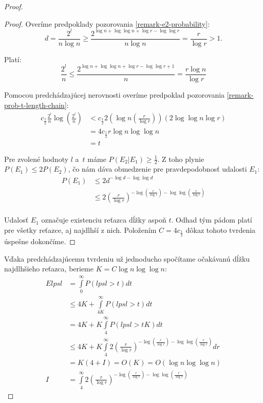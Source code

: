 \begin{proof}
\begin{proof}
Overíme predpoklady pozorovania \ref{remark-e2-probability}:
\begin{displaymath}
d = \frac{2^l}{n \log n} \geq \frac{2^{\log n + \log \log n + \log r - \log \log r}}{n \log n} = \frac{r}{\log r} > 1\textit{.}
\end{displaymath}

Platí:
\begin{displaymath}
\frac{2^l}{n} \leq \frac{2 ^{\log n + \log \log n + \log r - \log \log r + 1}}{n} = \frac{r\log n}{\log r}
\end{displaymath}

Pomocou predchádzajúcej nerovnosti overíme predpoklad pozorovania \ref{remark-prob-t-length-chain}:
\begin{displaymath}
\begin{split}
c_{\frac{1}{2}}\frac{2^l}{n}\log\left(\frac{2^l}{n}\right)
	& < c_{\frac{1}{2}} 2 \left(\log n \left(\frac{r}{\log r}\right)\right)\left(2\log\log n \log r\right) \\
	& = 4 c_{\frac{1}{2}} r \log n \log \log n \\
	& = t
\end{split}
\end{displaymath}

Pre zvolené hodnoty $l$ a~$t$ máme $P(E_2 | E_1) \geq \frac{1}{2}$. Z toho plynie $P(E_1) \leq 2 P(E_2)$, čo nám dáva obmedzenie pre pravdepodobnosť udalosti $E_1$:
\begin{displaymath}
\begin{split}
P(E_1) 
	& \leq 2d^{-\log d - \log \log d} \\
	& \leq 2\left(\frac{r}{\log r}\right)^{-\log \left(\frac{r}{\log r}\right) - \log \log \left(\frac{r}{\log r}\right)} \\
\end{split}
\end{displaymath}

Udalosť $E_1$ označuje existenciu reťazca dĺžky aspoň $t$. Odhad tým pádom platí pre všetky reťazce, aj najdlhší z nich. Položením $C = 4c_{\frac{1}{2}}$ dôkaz tohoto tvrdenia úspešne dokončíme.
\end{proof}

Vďaka predchádzajúcemu tvrdeniu už jednoducho spočítame očakávanú dĺžku najdlhšieho reťazca, berieme $K = C\log n \log \log n$:
\begin{displaymath}
\begin{split}
E lpsl 
	& = \int\limits_0^{\infty} P(lpsl > t) dt \\
	& \leq 4K + \int\limits_{4K}^\infty P(lpsl > t) dt \\
	& = 4K + K \int\limits_4^\infty P(lpsl > tK) dt \\
	& \leq 4K + K \int\limits_4^\infty 2 \left(\frac{r}{\log r}\right)^{-\log \left(\frac{r}{\log r}\right) - \log \log \left(\frac{r}{\log r}\right)} dr \\
	& = K(4 + I) = O(K) = O(\log n \log \log n) \\
I 	& = \int\limits_4^\infty 2 \left(\frac{r}{\log r}\right)^{-\log \left(\frac{r}{\log r}\right) - \log \log \left(\frac{r}{\log r}\right)}
\end{split}
\end{displaymath}


\end{proof}
